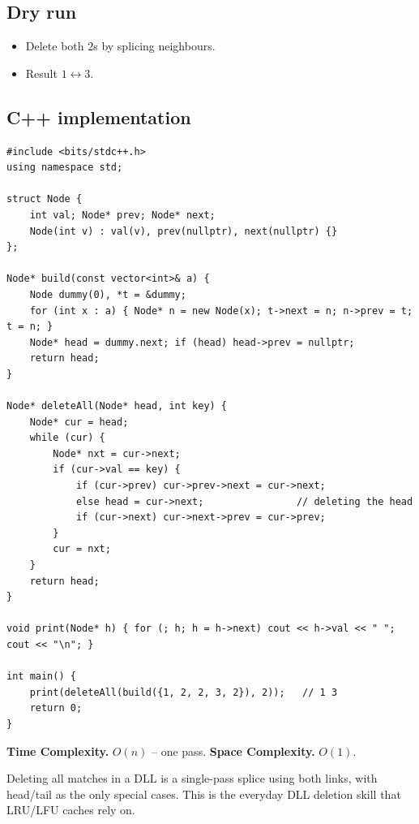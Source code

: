 \subsection*{Dry run}


\begin{itemize}
  \item Delete both $2$s by splicing neighbours.
  \item Result $1\leftrightarrow3$.
\end{itemize}

\subsection*{C++ implementation}

\begin{lstlisting}
#include <bits/stdc++.h>
using namespace std;

struct Node {
    int val; Node* prev; Node* next;
    Node(int v) : val(v), prev(nullptr), next(nullptr) {}
};

Node* build(const vector<int>& a) {
    Node dummy(0), *t = &dummy;
    for (int x : a) { Node* n = new Node(x); t->next = n; n->prev = t; t = n; }
    Node* head = dummy.next; if (head) head->prev = nullptr;
    return head;
}

Node* deleteAll(Node* head, int key) {
    Node* cur = head;
    while (cur) {
        Node* nxt = cur->next;
        if (cur->val == key) {
            if (cur->prev) cur->prev->next = cur->next;
            else head = cur->next;                // deleting the head
            if (cur->next) cur->next->prev = cur->prev;
        }
        cur = nxt;
    }
    return head;
}

void print(Node* h) { for (; h; h = h->next) cout << h->val << " "; cout << "\n"; }

int main() {
    print(deleteAll(build({1, 2, 2, 3, 2}), 2));   // 1 3
    return 0;
}
\end{lstlisting}

\begin{complexitybox}
\textbf{Time Complexity.} $O(n)$ -- one pass. \textbf{Space Complexity.}
$O(1)$.
\end{complexitybox}

\begin{takeawaybox}
Deleting all matches in a DLL is a single-pass splice using both links,
with head/tail as the only special cases. This is the everyday DLL deletion
skill that LRU/LFU caches rely on.
\end{takeawaybox}

